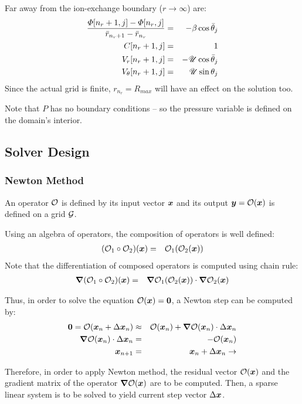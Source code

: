Far away from the ion-exchange boundary ($r\rightarrow\infty$) are:
\begin{eqnarray}
\frac{\varPhi[n_r + 1, j] - \varPhi[n_r, j]}{\bar{r}_{n_r + 1} - \bar{r}_{n_r}} 
 & = & -\beta \cos\bar{\theta}_j \\
C[n_r + 1, j] & = & 1 \\
V_r[n_r + 1, j] & = & -\mathscr{U} \cos\bar{\theta}_j \\
V_\theta[n_r + 1, j] & = & \mathscr{U} \sin\theta_j
\end{eqnarray}
Since the actual grid is finite, $r_{n_r} = R_{max}$ will have an effect on the solution too.

Note that $P$ has no boundary conditions -- so the pressure variable is defined 
on the domain's interior.

\subsection{Solver Design}
\subsubsection{Newton Method}
An operator $\mathcal{O}$ is defined by its input vector $\boldsymbol{x}$ and its output 
$\boldsymbol{y} = \mathcal{O}(\boldsymbol{x})$ is defined on a grid $\mathcal{G}$.

Using an algebra of operators, the composition of operators is well defined:
\begin{eqnarray}
(\mathcal{O}_1 \circ \mathcal{O}_2)(\boldsymbol{x}) &=& \mathcal{O}_1(\mathcal{O}_2(\boldsymbol{x}))
\end{eqnarray}
Note that the differentiation of composed operators is computed using chain rule:
\begin{eqnarray}
\boldsymbol{\nabla}(\mathcal{O}_1 \circ \mathcal{O}_2)(\boldsymbol{x}) &=& \boldsymbol{\nabla} \mathcal{O}_1(\mathcal{O}_2(\boldsymbol{x})) \cdot \boldsymbol{\nabla} \mathcal{O}_2(\boldsymbol{x})
\end{eqnarray}

Thus, in order to solve the equation $\mathcal{O}(\boldsymbol{x}) = \boldsymbol{0}$, a Newton step can 
be computed by:
\begin{eqnarray}
\boldsymbol{0} = \mathcal{O}(\boldsymbol{x}_n + \Delta \boldsymbol{x}_n) &\approx& \mathcal{O}(\boldsymbol{x}_n) + \boldsymbol{\nabla} \mathcal{O}(\boldsymbol{x}_n)\cdot\Delta\boldsymbol{x}_n \\
\boldsymbol{\nabla} \mathcal{O}(\boldsymbol{x}_n) \cdot \Delta \boldsymbol{x}_n &=& -\mathcal{O}(\boldsymbol{x}_n) \\
\boldsymbol{x}_{n+1} &=& \boldsymbol{x}_{n} + \Delta \boldsymbol{x}_n \rightarrow
\end{eqnarray}

Therefore, in order to apply Newton method, the residual vector $\mathcal{O}(\boldsymbol{x})$ and
the gradient matrix of the operator $\boldsymbol{\nabla} \mathcal{O}(\boldsymbol{x})$ are to be computed.
Then, a sparse linear system is to be solved to yield current step vector $\Delta \boldsymbol{x}$.

